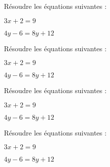 \documentclass{exos}
\begin{document}
\begin{exercize*}
Résoudre les équations suivantes :
\begin{alphaquestions}
\item $3x + 2 = 9$
\item $4y - 6 = 8y + 12$ 
\end{alphaquestions}
\end{exercize*}
\vspace*{2cm}
\begin{exercize*}
Résoudre les équations suivantes :
\begin{alphaquestions}
\item $3x + 2 = 9$
\item $4y - 6 = 8y + 12$ 
\end{alphaquestions}
\end{exercize*}
\vspace*{2cm}
\begin{exercize*}
Résoudre les équations suivantes :
\begin{alphaquestions}
\item $3x + 2 = 9$
\item $4y - 6 = 8y + 12$ 
\end{alphaquestions}
\end{exercize*}
\vspace*{2cm}
\begin{exercize*}
Résoudre les équations suivantes :
\begin{alphaquestions}
\item $3x + 2 = 9$
\item $4y - 6 = 8y + 12$ 
\end{alphaquestions}
\end{exercize*}
\vspace*{2cm}
\end{document}
